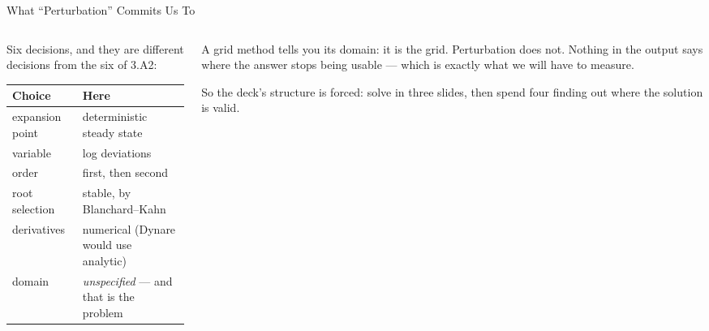 \begin{frame}{What ``Perturbation'' Commits Us To}
\begin{columns}[T]
\begin{column}{0.53\textwidth}
\small
Six decisions, and they are different decisions from the six of 3.A2:
\medskip
\begin{center}\footnotesize
\begin{tabularx}{\linewidth}{@{}>{\raggedright\arraybackslash}p{2.5cm} >{\raggedright\arraybackslash}X@{}}
\toprule
\textbf{Choice} & \textbf{Here} \\
\midrule
expansion point & deterministic steady state \\
variable & log deviations \\
order & first, then second \\
root selection & stable, by Blanchard--Kahn \\
derivatives & numerical (Dynare would use analytic) \\
domain & \emph{unspecified} --- and that is the problem \\
\bottomrule
\end{tabularx}
\end{center}
\end{column}
\begin{column}{0.44\textwidth}
\begin{cautionbox}[title=\textbf{The last row}]\small
A grid method tells you its domain: it is the grid. Perturbation does not. Nothing in the output says where the answer stops being usable --- which is exactly what we will have to measure.
\end{cautionbox}
\medskip
\begin{takeawaybox}\footnotesize
So the deck's structure is forced: solve in three slides, then spend four finding out where the solution is valid.
\end{takeawaybox}
\end{column}
\end{columns}
\end{frame}

